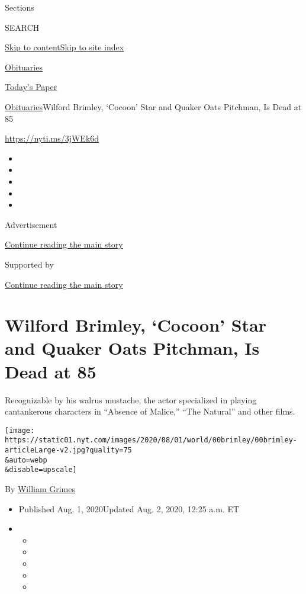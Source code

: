 Sections

SEARCH

\protect\hyperlink{site-content}{Skip to
content}\protect\hyperlink{site-index}{Skip to site index}

\href{https://www.nytimes.com/section/obituaries}{Obituaries}

\href{https://myaccount.nytimes.com/auth/login?response_type=cookie\&client_id=vi}{}

\href{https://www.nytimes.com/section/todayspaper}{Today's Paper}

\href{/section/obituaries}{Obituaries}\textbar{}Wilford Brimley,
`Cocoon' Star and Quaker Oats Pitchman, Is Dead at 85

\url{https://nyti.ms/3jWEk6d}

\begin{itemize}
\item
\item
\item
\item
\item
\end{itemize}

Advertisement

\protect\hyperlink{after-top}{Continue reading the main story}

Supported by

\protect\hyperlink{after-sponsor}{Continue reading the main story}

\hypertarget{wilford-brimley-cocoon-star-and-quaker-oats-pitchman-is-dead-at-85}{%
\section{Wilford Brimley, `Cocoon' Star and Quaker Oats Pitchman, Is
Dead at
85}\label{wilford-brimley-cocoon-star-and-quaker-oats-pitchman-is-dead-at-85}}

Recognizable by his walrus mustache, the actor specialized in playing
cantankerous characters in ``Absence of Malice,'' ``The Natural'' and
other films.

\texttt{[image: https://static01.nyt.com/images/2020/08/01/world/00brimley/00brimley-articleLarge-v2.jpg?quality=75\\\&auto=webp\\\&disable=upscale]}

By \href{https://www.nytimes.com/by/william-grimes}{William Grimes}

\begin{itemize}
\item
  Published Aug. 1, 2020Updated Aug. 2, 2020, 12:25 a.m. ET
\item
  \begin{itemize}
  \item
  \item
  \item
  \item
  \item
  \end{itemize}
\end{itemize}

